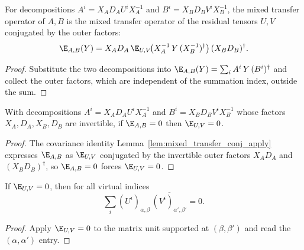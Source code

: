 \begin{lemma}%
    \label{lem:mixed_transfer_conj_apply}
    \leanok
    For decompositions $A^i = X_A D_A U^i X_A^{-1}$ and
    $B^i = X_B D_B V^i X_B^{-1}$, the mixed transfer operator of $A,B$ is the
    mixed transfer operator of the residual tensors $U,V$ conjugated by the outer
    factors:
    \[
        \E_{A,B}(Y)
        = X_A D_A\,\E_{U,V}\!\bigl(X_A^{-1}\,Y\,(X_B^{-1})^\dagger\bigr)\,
            (X_B D_B)^\dagger .
    \]
\end{lemma}
\begin{proof}\leanok
    Substitute the two decompositions into
    $\E_{A,B}(Y)=\sum_i A^i\,Y\,(B^i)^\dagger$ and collect the outer factors,
    which are independent of the summation index, outside the sum.
\end{proof}

\begin{lemma}%
    \label{lem:mixed_transfer_eq_zero_of_conj}
    \leanok
    With decompositions $A^i = X_A D_A U^i X_A^{-1}$ and
    $B^i = X_B D_B V^i X_B^{-1}$ whose factors $X_A, D_A, X_B, D_B$ are
    invertible, if $\E_{A,B}=0$ then $\E_{U,V}=0$.
\end{lemma}
\begin{proof}\leanok
    The covariance identity Lemma~\ref{lem:mixed_transfer_conj_apply} expresses
    $\E_{A,B}$ as $\E_{U,V}$ conjugated by the invertible outer factors
    $X_A D_A$ and $(X_B D_B)^\dagger$, so $\E_{A,B}=0$ forces $\E_{U,V}=0$.
\end{proof}

\begin{lemma}%
    \label{lem:residual_isometry_entry}
    \leanok
    If $\E_{U,V}=0$, then for all virtual indices
    \[
        \sum_i (U^i)_{\alpha,\beta}\,\overline{(V^i)_{\alpha',\beta'}} = 0 .
    \]
\end{lemma}
\begin{proof}\leanok
    Apply $\E_{U,V}=0$ to the matrix unit supported at $(\beta,\beta')$ and read
    the $(\alpha,\alpha')$ entry.
\end{proof}

